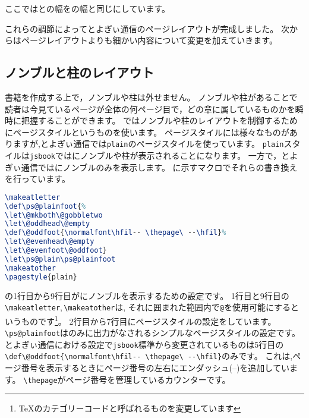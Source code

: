ここではとの幅をの幅と同じにしています。

これらの調節によってとよぎぃ通信のページレイアウトが完成しました。
次からはページレイアウトよりも細かい内容について変更を加えていきます。

\subsection{ノンブルと柱のレイアウト}

書籍を作成する上で，ノンブルや柱は外せません。
ノンブルや柱があることで読者は今見ているページが全体の何ページ目で，どの章に属しているものかを瞬時に把握することができます。
{\pLaTeX}ではノンブルや柱のレイアウトを制御するためにページスタイルというものを使います。
ページスタイルには様々なものがありますが,とよぎぃ通信では\verb|plain|のページスタイルを使っています。
\texttt{plain}スタイルは\texttt{jsbook}ではにノンブルや柱が表示されることになります。
一方で，とよぎぃ通信ではにノンブルのみを表示します。
に示すマクロでそれらの書き換えを行っています。

\begin{lstlisting}[caption = ノンブルと柱のレイアウト, label = list:footer, language=tex]
\makeatletter
\def\ps@plainfoot{%
\let\@mkboth\@gobbletwo
\let\@oddhead\@empty
\def\@oddfoot{\normalfont\hfil-- \thepage\ --\hfil}%
\let\@evenhead\@empty
\let\@evenfoot\@oddfoot}
\let\ps@plain\ps@plainfoot
\makeatother
\pagestyle{plain}
\end{lstlisting}

の1行目から9行目がにノンブルを表示するための設定です。
1行目と9行目の\verb|\makeatletter|,\,\verb|\makeatother|は,
それに囲まれた範囲内で\texttt{@}を使用可能にするというものです\footnote{{\TeX}のカテゴリーコードと呼ばれるものを変更しています}。
2行目から7行目にページスタイルの設定をしています。
\verb|\ps@plainfoot|はのみに出力がなされるシンプルなページスタイルの設定です。
とよぎぃ通信における設定で\verb|jsbook|標準から変更されているものは5行目の\verb|\def\@oddfoot{\normalfont\hfil-- \thepage\ --\hfil}|のみです。
これは,ページ番号を表示するときにページ番号の左右にエンダッシュ(--)を追加しています。
\verb|\thepage|がページ番号を管理しているカウンターです。

